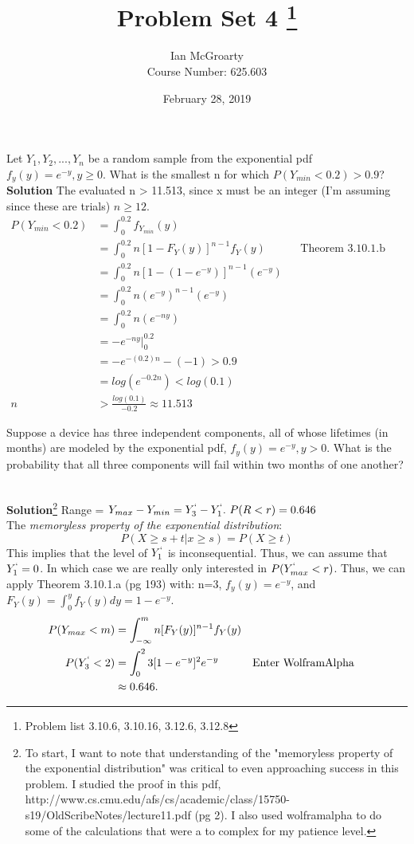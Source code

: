 \documentclass[12pt]{article}
\title{Problem Set 4 \thanks{Problem list 3.10.6, 3.10.16, 3.12.6, 3.12.8}}
\author{Ian McGroarty \\
	Course Number: 625.603}
\date{February 28, 2019}
\newenvironment{problem}[2][Problem]{\begin{trivlist}
\item[\hskip \labelsep {\bfseries #1}\hskip \labelsep {\bfseries #2.}]}{\end{trivlist}}
\begin{document}
\maketitle
\newpage
\begin{problem}{3.10.6} Let $Y_1, Y_2, ... , Y_n$ be a random sample from the exponential pdf $f_y(y) = e^{-y}, y \geq 0$. What is the smallest n for which $P(Y_{min} < 0.2) > 0.9$? \\
\textbf{Solution} The evaluated n > 11.513, since x must be an integer (I'm assuming since these are trials) $n\geq 12$.
\begin{align*}
P(Y_{min}<0.2) &= \int_0^{0.2} f_{Y_{min}}(y) \\
&=\int_0^{0.2} n[1-F_Y(y)]^{n-1}f_Y(y) && \text{Theorem 3.10.1.b (pg193)} \\
&=\int_0^{0.2} n[1-(1-e^{-y})]^{n-1}(e^{-y}) \\
&= \int_0^{0.2}n(e^{-y})^{n-1}(e^{-y}) \\
&= \int_0^{0.2}n(e^{-ny}) \\
&= -e^{-ny} \Big|_0^{0.2} \\
&= -e^{-(0.2)n}-(-1) >0.9 \\
&= log(e^{-0.2n}) < log(0.1) \\
n&>\frac{log(0.1)}{-0.2} \approx 11.513
\end{align*}

\end{problem}

\begin{problem}{3.10.16} Suppose a device has three independent components, all of whose lifetimes (in months) are modeled by the exponential pdf, $f_y(y) = e^{-y}, y > 0 $. What is the probability that all three components will fail within two months of one another? \\ \

\textbf{Solution}\footnote{To start, I want to note that understanding of the "memoryless property of the exponential distribution" was critical to even approaching success in this problem. I studied the proof in this pdf, http://www.cs.cmu.edu/afs/cs/academic/class/15750-s19/OldScribeNotes/lecture11.pdf (pg 2). I also used wolframalpha to do some of the calculations that were a to complex for my patience level.} Range = $Y_{max}-Y_{min}=Y^`_3-Y^`_1. \ P(R<r)=0.646$ \\
 The \textit{memoryless property of the exponential distribution}: $$P(X\geq s+t | x \geq s) = P(X\geq t)$$
 This implies that the level of $Y^`_1$ is inconsequential. Thus, we can assume that $Y^`_1 = 0$. In which case we are really only interested in $P(Y^`_{max} < r)$. Thus, we can apply Theorem 3.10.1.a (pg 193) with: n=3, $f_y(y)=e^{-y}$, and $F_Y(y) = \int_0^y f_Y(y)dy = 1-e^{-y}$. 
\begin{align*}
P(Y_{max} < m) &= \int_{-\infty}^m n[F_Y(y)]^{n-1}f_Y(y) \\
P(Y^`_3 < 2) &= \int_0^2  3[1-e^{-y}]^2 e^{-y} &&\text{Enter WolframAlpha} \\
&\approx 0.646. 
\end{align*}
\end{problem}
\end{document}
